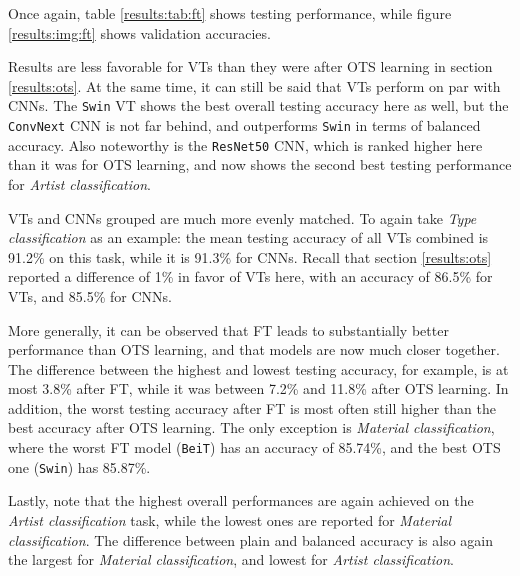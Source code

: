 Once again, table \ref{results:tab:ft} shows testing performance, while figure \ref{results:img:ft} shows validation accuracies.

Results are less favorable for VTs than they were after OTS learning in section \ref{results:ots}. At the same time, it can still be said that VTs perform on par with CNNs. The \texttt{Swin} VT shows the best overall testing accuracy here as well, but the \texttt{ConvNext} CNN is not far behind, and outperforms \texttt{Swin} in terms of balanced accuracy. Also noteworthy is the \texttt{ResNet50} CNN, which is ranked higher here than it was for OTS learning, and now shows the second best testing performance for \textit{Artist classification}.

VTs and CNNs grouped are much more evenly matched. To again take \textit{Type classification} as an example: the mean testing accuracy of all VTs combined is 91.2\% on this task, while it is 91.3\% for CNNs. Recall that section \ref{results:ots} reported a difference of 1\% in favor of VTs here, with an accuracy of 86.5\% for VTs, and 85.5\% for CNNs.

More generally, it can be observed that FT leads to substantially better performance than OTS learning, and that models are now much closer together. The difference between the highest and lowest testing accuracy, for example, is at most 3.8\% after FT, while it was between 7.2\% and 11.8\% after OTS learning. In addition, the worst testing accuracy after FT is most often still higher than the best accuracy after OTS learning. The only exception is \textit{Material classification}, where the worst FT model (\texttt{BeiT}) has an accuracy of 85.74\%, and the best OTS one (\texttt{Swin}) has 85.87\%.

Lastly, note that the highest overall performances are again achieved on the \textit{Artist classification} task, while the lowest ones are reported for \textit{Material classification}. The difference between plain and balanced accuracy is also again the largest for \textit{Material classification}, and lowest for \textit{Artist classification}.



